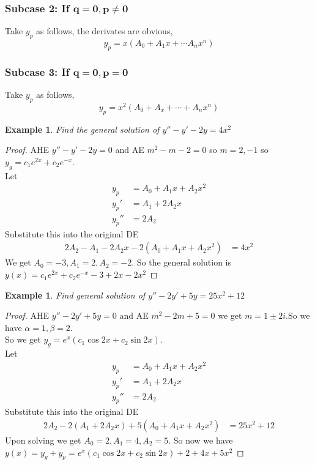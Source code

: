 \documentclass[oneside,11pt,pdftex,final]{book}%
\numberwithin{equation}{section}
\newtheorem{example}[theorem]{Example}
\numberwithin{section}{chapter}
\numberwithin{equation}{chapter}
\begin{document}
\subsubsection{Subcase 2: If $ \mathbf{q=0, p \neq 0} $}
Take $ y_p $ as follows, the derivates are obvious,
$$y_p=x(A_0+A_1x+\cdots A_nx^n) $$
\subsubsection{Subcase 3: If $ \mathbf{q=0,p=0} $}
Take $ y_p $ as follows,
$$ y_p=x^2(A_0+A_x+\cdots + A_n x^n) $$


\begin{example}
	Find the general solution of $ y''-y'-2y=4x^2 $
\end{example}
\begin{proof}
	AHE $ y''-y'-2y=0 $ and AE $ m^2-m-2=0 $ so $ m=2,-1 $ so $ y_g=c_1e^{2x}+c_2e^{-x} $.\\
	Let 
	\begin{align*}
		y_p&=A_0+A_1x+A_2x^2 \\
		y_p'&=A_1+2A_2x\\
		y_p''&=2A_2
	\end{align*}
Substitute this into the original DE
\begin{align*}
	2A_2-A_1-2A_2x-2(A_0+A_1x+A_2x^2)&=4x^2
\end{align*}
We get $ A_0=-3,A_1=2,A_2=-2 $.
So the general solution is $ y(x)=c_1e^{2x}+c_2e^{-x}-3+2x-2x^2 $
\end{proof}

\begin{example}
	Find general solution of $ y''-2y'+5y=25x^2+12 $
\end{example}
\begin{proof}
	AHE $ y''-2y'+5y=0 $ and AE $ m^2-2m+5=0 $ we get $ m=1\pm2i $.So we have $ \alpha=1, \beta=2 $.\\
	So we get $ y_g=e^{x}(c_1 \cos 2x + c_2 \sin 2x) $.\\
	Let
	\begin{align*}
		y_p&=A_0+A_1x+A_2x^2\\
		y_p'&=A_1+2A_2x\\
		y_p''&=2A_2
	\end{align*}
Substitute this into the original DE
\begin{align*}
	2A_2-2(A_1+2A_2x)+5(A_0+A_1x+A_2x^2)&=25x^2+12
\end{align*}
Upon solving we get $ A_0=2, A_1=4, A_2=5 $. So now we have $ y(x)=y_g+y_p=e^{x}(c_1 \cos 2x + c_2 \sin 2x)+2+4x+5x^2 $
\end{proof}
\end{document}
